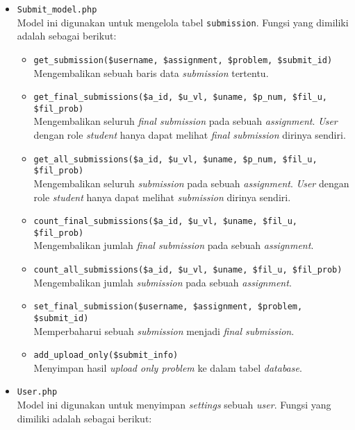 \begin{itemize}
      \item \verb|Submit_model.php| \\
            Model ini digunakan untuk mengelola tabel \verb|submission|. Fungsi yang dimiliki adalah sebagai berikut:

            \begin{itemize}
                  \item \verb|get_submission($username, $assignment, $problem, $submit_id)| \\
                        Mengembalikan sebuah baris data \textit{submission} tertentu.
                  \item \verb|get_final_submissions($a_id, $u_vl, $uname, $p_num, $fil_u, $fil_prob)| \\
                        Mengembalikan seluruh \textit{final submission} pada sebuah \textit{assignment}. \textit{User} dengan role \textit{student} hanya dapat melihat \textit{final submission} dirinya sendiri.
                  \item \verb|get_all_submissions($a_id, $u_vl, $uname, $p_num, $fil_u, $fil_prob)| \\
                        Mengembalikan seluruh \textit{submission} pada sebuah \textit{assignment}. \textit{User} dengan role \textit{student} hanya dapat melihat \textit{submission} dirinya sendiri.
                  \item \verb|count_final_submissions($a_id, $u_vl, $uname, $fil_u, $fil_prob)| \\
                        Mengembalikan jumlah \textit{final submission} pada sebuah \textit{assignment}.
                  \item \verb|count_all_submissions($a_id, $u_vl, $uname, $fil_u, $fil_prob)| \\
                        Mengembalikan jumlah \textit{submission} pada sebuah \textit{assignment}.
                  \item \verb|set_final_submission($username, $assignment, $problem, $submit_id)| \\
                        Memperbaharui sebuah \textit{submission} menjadi \textit{final submission}.
                  \item \verb|add_upload_only($submit_info)| \\
                        Menyimpan hasil \textit{upload only problem} ke dalam tabel \textit{database}.
            \end{itemize}

      \item \verb|User.php| \\
            Model ini digunakan untuk menyimpan \textit{settings} sebuah \textit{user}. Fungsi yang dimiliki adalah sebagai berikut:


\end{itemize}
